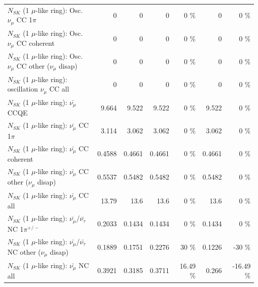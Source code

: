 \begin{table}
\begin{tabular}{| l | r | r | r  r | r  r |}
                          $N_{SK}$ (1 $\mu$-like ring): Osc. $\nu_\mu$ CC 1$\pi$ &               0 &               0 &               0 &        0 \%  &               0 &        0 \%  \\ 
                        $N_{SK}$ (1 $\mu$-like ring): Osc. $\nu_\mu$ CC coherent &               0 &               0 &               0 &        0 \%  &               0 &        0 \%  \\ 
         $N_{SK}$ (1 $\mu$-like ring): Osc. $\nu_\mu$ CC other ($\nu_\mu$ disap) &               0 &               0 &               0 &        0 \%  &               0 &        0 \%  \\ 
                      $N_{SK}$ (1 $\mu$-like ring): oscillation $\nu_\mu$ CC all &               0 &               0 &               0 &        0 \%  &               0 &        0 \%  \\ 
\hline
\hline
                              $N_{SK}$ (1 $\mu$-like ring): $\bar{\nu_\mu}$ CCQE &           9.664 &           9.522 &           9.522 &        0 \%  &           9.522 &        0 \%  \\ 
                         $N_{SK}$ (1 $\mu$-like ring): $\bar{\nu_\mu}$ CC 1$\pi$ &           3.114 &           3.062 &           3.062 &        0 \%  &           3.062 &        0 \%  \\ 
                       $N_{SK}$ (1 $\mu$-like ring): $\bar{\nu_\mu}$ CC coherent &          0.4588 &          0.4661 &          0.4661 &        0 \%  &          0.4661 &        0 \%  \\ 
        $N_{SK}$ (1 $\mu$-like ring): $\bar{\nu_\mu}$ CC other ($\nu_\mu$ disap) &          0.5537 &          0.5482 &          0.5482 &        0 \%  &          0.5482 &        0 \%  \\ 
                          $N_{SK}$ (1 $\mu$-like ring): $\bar{\nu_{\mu}}$ CC all &           13.79 &            13.6 &            13.6 &        0 \%  &            13.6 &        0 \%  \\ 
\hline
  $N_{SK}$ (1 $\mu$-like ring): $\bar{\nu_\mu}$/$\bar{\nu_\tau}$ NC 1$\pi^{+/-}$ &          0.2033 &          0.1434 &          0.1434 &        0 \%  &          0.1434 &        0 \%  \\ 
$N_{SK}$ (1 $\mu$-like ring): $\bar{\nu_\mu}$/$\bar{\nu_\tau}$ NC other ($\nu_\mu$ disap) &          0.1889 &          0.1751 &          0.2276 &       30 \%  &          0.1226 &      -30 \%  \\ 
                          $N_{SK}$ (1 $\mu$-like ring): $\bar{\nu_{\mu}}$ NC all &          0.3921 &          0.3185 &          0.3711 &    16.49 \%  &           0.266 &   -16.49 \%  \\ 

\end{tabular}
\end{table}
